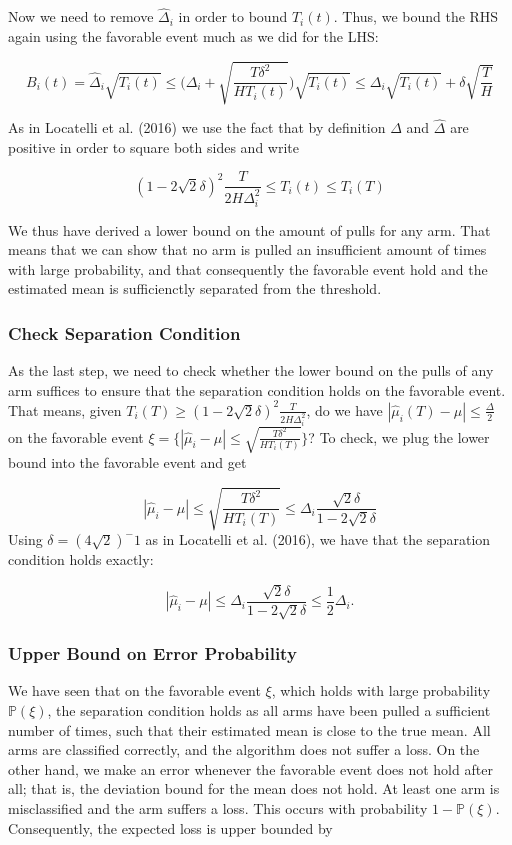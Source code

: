 \documentclass[11pt,]{article}
\begin{document}
Now we need to remove \(\hat{\Delta}_i\) in order to bound \(T_i(t)\).
Thus, we bound the RHS again using the favorable event much as we did
for the LHS:

\[
B_i(t) = \hat{\Delta}_i \sqrt{T_i(t)} \leq \Big(\Delta_i + \sqrt{\frac{T\delta^2}{HT_i(t)}}\Big) \sqrt{T_i(t)} \leq \Delta_i \sqrt{T_i(t)} + \delta \sqrt{\frac{T}{H}}
\]

As in Locatelli et al. (2016) we use the fact that by definition
\(\Delta\) and \(\hat{\Delta}\) are positive in order to square both
sides and write

\[
(1 - 2\sqrt{2}\delta)^2 \frac{T}{2H\Delta^2_i} \leq T_i(t) \leq T_i(T)
\]

We thus have derived a lower bound on the amount of pulls for any arm.
That means that we can show that no arm is pulled an insufficient amount
of times with large probability, and that consequently the favorable
event hold and the estimated mean is sufficienctly separated from the
threshold.

\subsubsection{Check Separation
Condition}\label{check-separation-condition}

As the last step, we need to check whether the lower bound on the pulls
of any arm suffices to ensure that the separation condition holds on the
favorable event. That means, given
\(T_i(T) \geq (1-2\sqrt{2}\delta)^2 \frac{T}{2H\Delta_i^2}\), do we have
\(|\hat{\mu}_i(T) - \mu | \leq \frac{\Delta}{2}\) on the favorable event
\(\xi = \Big\{|\hat{\mu}_i - \mu | \leq \sqrt{\frac{T\delta^2}{H T_i(T)}}\Big\}\)?
To check, we plug the lower bound into the favorable event and get

\[
|\hat{\mu}_i - \mu | \leq \sqrt{\frac{T\delta^2}{H T_i(T)}} \leq \Delta_i \frac{\sqrt{2}\delta}{1-2\sqrt{2}\delta}
\] Using \(\delta = (4\sqrt{2})^-1\) as in Locatelli et al. (2016), we
have that the separation condition holds exactly:

\[
|\hat{\mu}_i - \mu | \leq \Delta_i \frac{\sqrt{2}\delta}{1-2\sqrt{2}\delta} \leq \frac{1}{2}\Delta_i.
\]

\subsubsection{Upper Bound on Error
Probability}\label{upper-bound-on-error-probability}

We have seen that on the favorable event \(\xi\), which holds with large
probability \(\mathbb{P}(\xi)\), the separation condition holds as all
arms have been pulled a sufficient number of times, such that their
estimated mean is close to the true mean. All arms are classified
correctly, and the algorithm does not suffer a loss. On the other hand,
we make an error whenever the favorable event does not hold after all;
that is, the deviation bound for the mean does not hold. At least one
arm is misclassified and the arm suffers a loss. This occurs with
probability \(1-\mathbb{P}(\xi)\). Consequently, the expected loss is
upper bounded by
\end{document}
